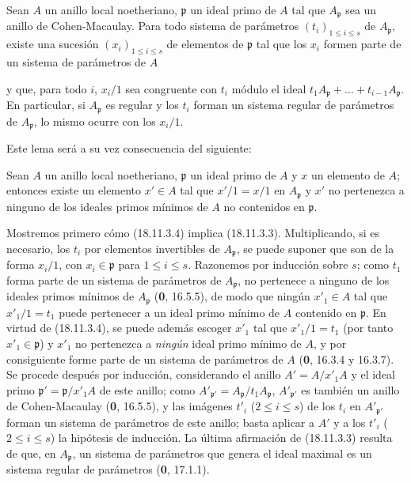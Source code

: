\begin{lemma}[18.11.3.3]
\label{IV.18.11.3.3}
Sean $A$ un anillo local noetheriano, $\mathfrak p$ un ideal primo de $A$ tal que $A_{\mathfrak p}$ sea un anillo de Cohen-Macaulay. Para todo sistema de parámetros $(t_i)_{1\leq i\leq s}$ de $A_{\mathfrak p}$, existe una sucesión $(x_i)_{1\leq i\leq s}$ de elementos de $\mathfrak p$ tal que los $x_i$ formen parte de un sistema de parámetros de $A$


y que, para todo $i$, $x_i/1$ sea congruente con $t_i$ módulo el ideal $t_1A_{\mathfrak p}+\ldots+t_{i-1}A_{\mathfrak p}$. En particular, si $A_{\mathfrak p}$ es regular y los $t_i$ forman un sistema \textup{regular} de parámetros de $A_{\mathfrak p}$, lo mismo ocurre con los $x_i/1$.
\end{lemma}

Este lema será a su vez consecuencia del siguiente:

\begin{lemma}[18.11.3.4]
\label{IV.18.11.3.4}
Sean $A$ un anillo local noetheriano, $\mathfrak p$ un ideal primo de $A$ y $x$ un elemento de $A$; entonces existe un elemento $x'\in A$ tal que $x'/1=x/1$ en $A_{\mathfrak p}$ y $x'$ no pertenezca a ninguno de los ideales primos mínimos de $A$ no contenidos en $\mathfrak p$.
\end{lemma}

Mostremos primero cómo (18.11.3.4) implica (18.11.3.3). Multiplicando, si es necesario, los $t_i$ por elementos invertibles de $A_{\mathfrak p}$, se puede suponer que son de la forma $x_i/1$, con $x_i\in\mathfrak p$ para $1\leq i\leq s$. Razonemos por inducción sobre $s$; como $t_1$ forma parte de un sistema de parámetros de $A_{\mathfrak p}$, no pertenece a ninguno de los ideales primos mínimos de $A_{\mathfrak p}$ (\textbf 0, 16.5.5), de modo que ningún $x'_1\in A$ tal que $x'_1/1=t_1$ puede pertenecer a un ideal primo mínimo de $A$ contenido en $\mathfrak p$. En virtud de (18.11.3.4), se puede además escoger $x'_1$ tal que $x'_1/1=t_1$ (por tanto $x'_1\in\mathfrak p$) y $x'_1$ no pertenezca a \emph{ningún} ideal primo mínimo de $A$, y por consiguiente forme parte de un sistema de parámetros de $A$ (\textbf 0, 16.3.4 y 16.3.7). Se procede después por inducción, considerando el anillo $A'=A/x'_1A$ y el ideal primo $\mathfrak p'=\mathfrak p/x'_1A$ de este anillo; como $A'_{\mathfrak p'}=A_{\mathfrak p}/t_1A_{\mathfrak p}$, $A'_{\mathfrak p'}$ es también un anillo de Cohen-Macaulay (\textbf 0, 16.5.5), y las imágenes $t'_i$ ($2\leq i\leq s$) de los $t_i$ en $A'_{\mathfrak p'}$ forman un sistema de parámetros de este anillo; basta aplicar a $A'$ y a los $t'_i$ ($2\leq i\leq s$) la hipótesis de inducción. La última afirmación de (18.11.3.3) resulta de que, en $A_{\mathfrak p}$, un sistema de parámetros que genera el ideal maximal es un sistema regular de parámetros (\textbf 0, 17.1.1).

